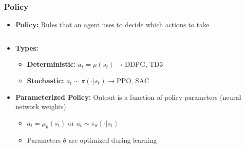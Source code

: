 \begin{frame}
    \frametitle{Policy}
    \begin{itemize}
        \item \textbf{Policy:} Rules that an agent uses to decide which actions to take
    \end{itemize}
    \vspace{5pt}
    \begin{columns}[T]
        \begin{column}{0.55\textwidth}
            \begin{itemize}
                \item \textbf{Types:}
                \begin{itemize}\itemsep=2pt 
                    \item \textbf{Deterministic:} $a_t = \mu(s_t)\to \text{DDPG, TD3}
                    $
                    \item \textbf{Stochastic:} $a_t \sim \pi(\cdot | s_t)\to \text{PPO, SAC}
                    $
                \end{itemize}
                \item \textbf{Parameterized Policy:} Output is a function of policy parameters (neural network weights)
                \begin{itemize}\itemsep=2pt 
                    \item $a_t = \mu_{\theta}(s_t)$ or $a_t \sim \pi_{\theta}(\cdot | s_t)$
                    \item Parameters $\theta$ are optimized during learning
                \end{itemize}
            \end{itemize}
        \end{column}
        

\end{columns}
\end{frame}
